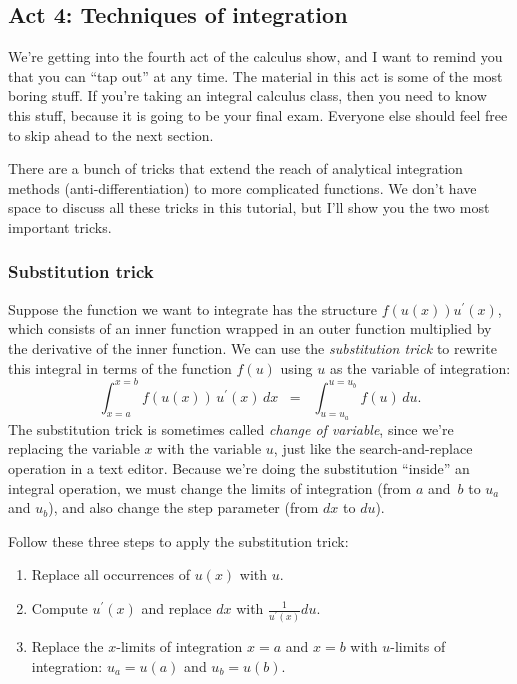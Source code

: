 

	\subsection{Act 4: Techniques of integration}
	\label{integrals:techniques_of_integration}

		We're getting into the fourth act of the calculus show,
		and I want to remind you that you can ``tap out'' at any time.
		The material in this act is some of the most boring stuff.
		If you're taking an integral calculus class, %
		then you need to know this stuff,
		because it is going to be your final exam.
		Everyone else
		should feel free to skip ahead to the next section.		%

		There are a bunch of tricks that extend the reach of analytical integration methods 
		(anti-differentiation) to more complicated functions.
		We don't have space to discuss all these tricks in this tutorial,
		but I'll show you the two most important tricks.

		\subsubsection{Substitution trick}

			Suppose the function we want to integrate has the structure $f(u(x))u^{\prime\!}(x)$,
			which consists of an inner function
			wrapped in an outer function
			multiplied by the derivative of the inner function.
			We can use the \emph{substitution trick} to rewrite this integral
			in terms of the function $f(u)$ using $u$ as the variable of integration:
			\[
				\int_{x = a}^{x = b} f(u(x)) \, u^{\prime\!}(x) \, dx
					\;\; = \;\; 	\int_{u = u_a}^{u = u_b} f(u) \, du.			
			\]
			The substitution trick is sometimes called \emph{change of variable},
			since we're replacing the variable $x$ with the variable $u$,
			just like the search-and-replace operation in a text editor.
			Because we're doing the substitution ``inside'' an integral operation,
			we must change the limits of integration (from $a$ and~$b$ to $u_a$ and $u_b$),
			and also change the step parameter (from $dx$ to $du$).

			\begin{shadebox}
			\vspace{1mm}
			\noindent
			Follow these three steps to apply the substitution trick:
			\begin{enumerate}
				\item	Replace all occurrences of $u(x)$ with $u$.
				\item	Compute $u^{\prime\!}(x)$ and replace $dx$ with $\frac{1}{u^{\prime\!}(x)}du$.
				\item	Replace the $x$-limits of integration $x=a$ and $x=b$
					with $u$-limits of integration: $u_a = u(a)$ and $u_b = u(b)$.
			\end{enumerate}
			\vspace{-1mm}
			\end{shadebox}	


